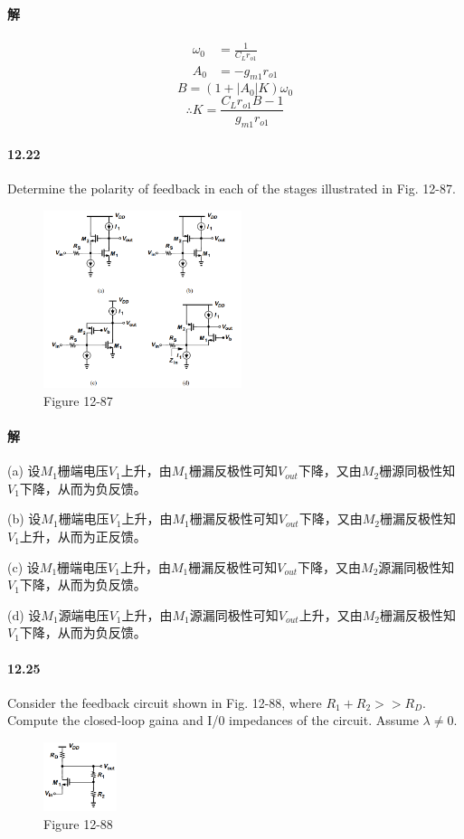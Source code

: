 \documentclass[hyperref, UTF8]{ctexart}
\newcommand{\under}[1]{\frac{1}{#1}}
\begin{document}
\paragraph{解}
    \begin{align*}
        \omega_0 & = \under{C_Lr_{o1}} \\
        A_0 & = -g_{m1}r_{o1} 
    \end{align*}
    $$B = (1+|A_0|K)\omega_0$$ 
    $$\therefore K = \frac{C_Lr_{o1}B - 1}{g_{m1}r_{o1}}$$
\paragraph{12.22} \label{12.22}
    Determine the polarity of feedback in each of the stages illustrated in Fig. 12-87.
    \begin{figure}[!htb]
        \centering
        \includegraphics[width=0.517\textwidth]{p12-87.png}
        \caption*{Figure 12-87}
    \end{figure}        
\paragraph{解}
    (a) 设$M_1$栅端电压$V_1$上升，由$M_1$栅漏反极性可知$V_{out}$下降，又由$M_2$栅源同极性知$V_1$下降，从而为负反馈。
    
    (b) 设$M_1$栅端电压$V_1$上升，由$M_1$栅漏反极性可知$V_{out}$下降，又由$M_2$栅漏反极性知$V_1$上升，从而为正反馈。

    (c) 设$M_1$栅端电压$V_1$上升，由$M_1$栅漏反极性可知$V_{out}$下降，又由$M_2$源漏同极性知$V_1$下降，从而为负反馈。

    (d) 设$M_1$源端电压$V_1$上升，由$M_1$源漏同极性可知$V_{out}$上升，又由$M_2$栅漏反极性知$V_1$下降，从而为负反馈。

\paragraph{12.25} \label{12.25}
    Consider the feedback circuit shown in Fig. 12-88, where $R_1 + R_2 >> R_D$. Compute the closed-loop gaina and I/0 impedances of the circuit. Assume $\lambda \neq 0$.
    \begin{figure}[!htb]
        \centering
        \includegraphics[width=0.192\textwidth]{p12-88.png}
        \caption*{Figure 12-88}
    \end{figure}        
\end{document}

